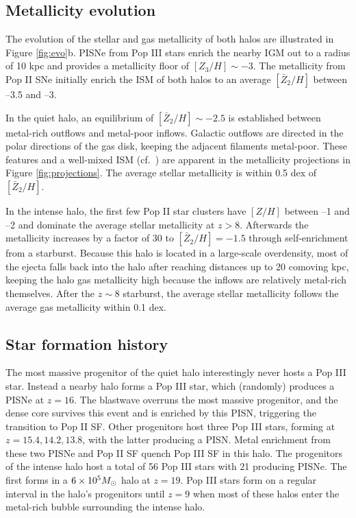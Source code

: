 \documentclass[12pt]{article}
\newcommand{\Ms}{\ifmmode{M_\odot}\else{$M_\odot$}\fi}
\begin{document}

\subsection*{Metallicity evolution}
\label{sec:zevo}

The evolution of the stellar and gas metallicity of both halos are
illustrated in Figure \ref{fig:evo}b.  PISNe from Pop III stars enrich
the nearby IGM out to a radius of 10 kpc and provides a metallicity
floor of $[Z_3/H] \sim -3$.  The metallicity from Pop II SNe initially
enrich the ISM of both halos to an average $[\bar{Z}_2/H]$ between
--3.5 and --3.  

In the quiet halo, an equilibrium of $[\bar{Z}_2/H] \sim -2.5$ is
established between metal-rich outflows and metal-poor inflows.
Galactic outflows are directed in the polar directions of the gas
disk, keeping the adjacent filaments metal-poor.  These features and a
well-mixed ISM (cf.~\cite{Wise08_Gal, Greif10}) are apparent in the
metallicity projections in Figure \ref{fig:projections}.  The average
stellar metallicity is within 0.5 dex of $[\bar{Z}_2/H]$.

In the intense halo, the first few Pop II star clusters have $[Z/H]$
between --1 and --2 and dominate the average stellar metallicity at $z
> 8$.  Afterwards the metallicity increases by a factor of 30 to
$[\bar{Z}_2/H] = -1.5$ through self-enrichment from a starburst.
Because this halo is located in a large-scale overdensity, most of the
ejecta falls back into the halo after reaching distances up to 20
comoving kpc, keeping the halo gas metallicity high because the
inflows are relatively metal-rich themselves.  After the $z \sim 8$
starburst, the average stellar metallicity follows the average gas
metallicity within 0.1 dex.

\subsection*{Star formation history}
\label{sec:pop}

The most massive progenitor of the quiet halo interestingly never
hosts a Pop III star.  Instead a nearby halo forms a Pop III star,
which (randomly) produces a PISNe at $z=16$.  The blastwave overruns
the most massive progenitor, and the dense core survives this event
and is enriched by this PISN, triggering the transition to Pop II SF.
Other progenitors host three Pop III stars, forming at $z = 15.4,
14.2, 13.8$, with the latter producing a PISN.  Metal enrichment from
these two PISNe and Pop II SF quench Pop III SF in this halo.  The
progenitors of the intense halo host a total of 56 Pop III stars with
21 producing PISNe.  The first forms in a $6 \times 10^5 \Ms$ halo at
$z=19$.  Pop III stars form on a regular interval in the halo's
progenitors until $z=9$ when most of these halos enter the metal-rich
bubble surrounding the intense halo.
\end{document}
